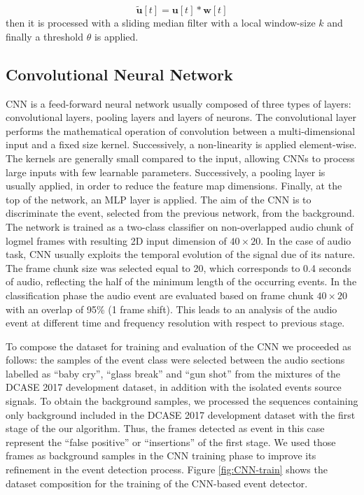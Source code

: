 \documentclass{article}
\begin{document}
\begin{sloppy}
\begin{equation}
\tilde{ \mathbf{u}}[t] = \mathbf{u}[t] \ast \mathbf{w}[t]
\end{equation}
then it is processed with a sliding median filter with a local window-size $k$ and finally a threshold $\theta$ is applied.

\subsection{Convolutional Neural Network}
\label{ssec:CNN}

CNN is a feed-forward neural network \cite{Yann-cnn-1998} usually composed of three types of layers: convolutional layers, pooling layers and layers of neurons. The convolutional layer performs the mathematical operation of convolution between a multi-dimensional input and a fixed size kernel. Successively, a non-linearity is applied element-wise. The kernels are generally small compared to the input, allowing CNNs to process large inputs with few learnable parameters. Successively, a pooling layer is usually applied, in order to reduce the feature map dimensions. Finally, at the top of the network, an MLP layer is applied.
The aim of the CNN is to discriminate the event, selected from the previous network, from the background. The network is trained as a two-class classifier on non-overlapped audio chunk of logmel frames with resulting 2D input dimension of $40\times20$. In the case of audio task, CNN usually exploits the temporal evolution of the signal \cite{thomas2014analyzing} due of its nature. 
The frame chunk size was selected equal to 20, which corresponds to 0.4 seconds of audio, reflecting the half of the minimum length of the occurring events.
In the classification phase the audio event are evaluated based on frame chunk $40\times20$ with an overlap of 95\% (1 frame shift). This leads to an analysis of the audio event at different time and frequency resolution with respect to previous stage. 

To compose the dataset for training and evaluation of the CNN we proceeded as follows: the samples of the event class were selected between the audio sections labelled as ``baby cry'', ``glass break'' and ``gun shot'' from the mixtures of the DCASE 2017 development dataset, in addition with the isolated events source signals. To obtain the background samples, we processed the sequences containing only background included in the DCASE 2017 development dataset with the first stage of the our algorithm. Thus, the frames detected as event in this case represent the ``false positive'' or ``insertions'' of the first stage. We used those frames as background samples in the CNN training phase to improve its refinement in the event detection process. Figure \ref{fig:CNN-train} shows the dataset composition for the training of the CNN-based event detector.


\end{sloppy}
\end{document}
